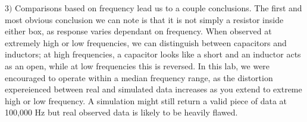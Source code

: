\documentclass{article}
\begin{document}
$3)$
Comparisons based on frequency lead us to a couple conclusions. The first and most obvious 
conclusion we can note is that it is not simply a resistor inside either box, as response varies 
dependant on frequency. When observed at extremely high or low frequencies, we can distinguish
between capacitors and inductors; at high frequencies, a capacitor looks like a short and an 
inductor acts as an open, while at low frequencies this is reversed. In this lab, we were 
encouraged to operate within a median frequency range, as the distortion expereienced between 
real and simulated data increases as you extend to extreme high or low frequency. A simulation 
might still return a valid piece of data at 100,000 Hz but real observed data is likely to 
be heavily flawed. 
\end{document}
